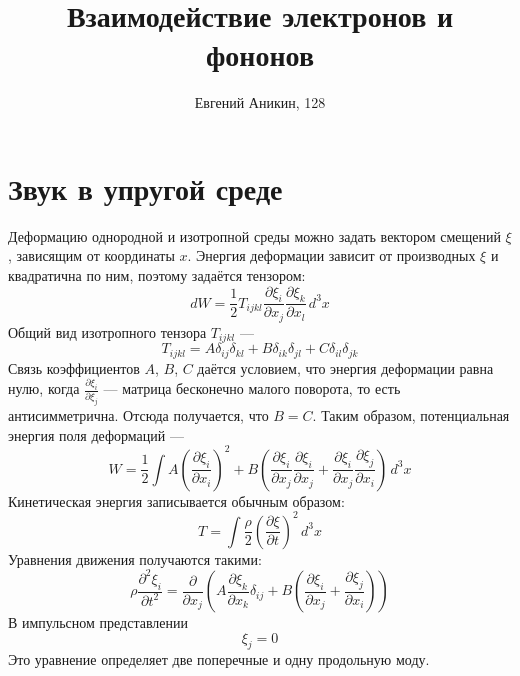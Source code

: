 \documentclass{article}
\title{Взаимодействие электронов и фононов}
\author{Евгений Аникин, 128}
\begin{document}
\maketitle
\section{Звук в упругой среде}
Деформацию однородной и изотропной среды можно задать вектором смещений $\xi$, зависящим от 
координаты $x$. Энергия деформации зависит от производных $\xi$ и квадратична по ним, поэтому
задаётся тензором:
\begin{equation}
    dW = \frac{1}{2} T_{ijkl}\frac{\partial\xi_i}{\partial x_j}
                    \frac{\partial\xi_k}{\partial x_l}\, d^3x
\end{equation}
Общий вид изотропного тензора $T_{ijkl}$ ---
\begin{equation}
    T_{ijkl} = A\delta_{ij}\delta_{kl} + B\delta_{ik}\delta_{jl} + C\delta_{il}\delta_{jk}
\end{equation}
Связь коэффициентов $A$, $B$, $C$ даётся условием, что энергия деформации равна нулю, когда
$\frac{\partial\xi_i}{\partial\xi_j}$ --- матрица бесконечно малого поворота, то есть 
антисимметрична. Отсюда получается, что $B = C$. Таким образом, потенциальная энергия
поля деформаций ---
\begin{equation}
    W = \frac{1}{2}\int A\left(\frac{\partial\xi_i}{\partial x_i}\right)^2 + 
                               B\left(\frac{\partial\xi_i}{\partial x_j}
                                 \frac{\partial\xi_i}{\partial x_j} + 
                                 \frac{\partial\xi_i}{\partial x_j}
                                 \frac{\partial\xi_j}{\partial x_i}\right)\, d^3 x
\end{equation}
Кинетическая энергия записывается обычным образом:
\begin{equation}
    T = \int \frac{\rho}{2}\left( \frac{\partial \xi}{\partial t}\right)^2 \,d^3x
\end{equation}
Уравнения движения получаются такими:
\begin{equation}
    \rho\frac{\partial^2 \xi_i}{\partial t^2} = 
        \frac{\partial}{\partial x_j}\left( A\frac{\partial\xi_k}{\partial x_k}\delta_{ij} + 
                                            B\left(\frac{\partial\xi_i}{\partial x_j} + 
                                                   \frac{\partial\xi_j}{\partial x_i}\right)
                                                   \right)
\end{equation}
В импульсном представлении
\begin{equation}
    [(\omega^2\rho - Bk^2)\delta_{ij} - (A + B)k_i k_j]\xi_j = 0
\end{equation}
Это уравнение определяет две поперечные и одну продольную моду.  
\end{document}

